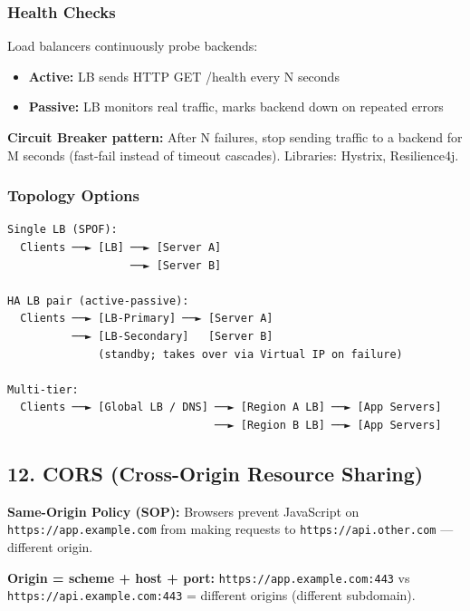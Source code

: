 \documentclass[11pt]{article}
\providecommand{\tightlist}{\setlength{\itemsep}{1pt}\setlength{\parskip}{0pt}}
\begin{document}
\subsubsection{Health Checks}\label{health-checks}

Load balancers continuously probe backends:

\begin{itemize}
\tightlist
\item
  \textbf{Active:} LB sends HTTP GET /health every N seconds
\item
  \textbf{Passive:} LB monitors real traffic, marks backend down on repeated errors
\end{itemize}

\textbf{Circuit Breaker pattern:} After N failures, stop sending traffic to a backend for M seconds (fast-fail instead of timeout cascades). Libraries: Hystrix, Resilience4j.

\subsubsection{Topology Options}\label{topology-options}

\setcodelang{}

\begin{verbatim}
Single LB (SPOF):
  Clients ──► [LB] ──► [Server A]
                   ──► [Server B]

HA LB pair (active-passive):
  Clients ──► [LB-Primary] ──► [Server A]
          ──► [LB-Secondary]   [Server B]
              (standby; takes over via Virtual IP on failure)

Multi-tier:
  Clients ──► [Global LB / DNS] ──► [Region A LB] ──► [App Servers]
                                ──► [Region B LB] ──► [App Servers]
\end{verbatim}

\subsection{12. CORS (Cross-Origin Resource Sharing)}\label{12-cors-cross-origin-resource-sharing}

\textbf{Same-Origin Policy (SOP):} Browsers prevent JavaScript on \texttt{https://app.example.com} from making requests to \texttt{https://api.other.com} --- different origin.

\textbf{Origin = scheme + host + port:} \texttt{https://app.example.com:443} vs \texttt{https://api.example.com:443} = different origins (different subdomain).
\end{document}
